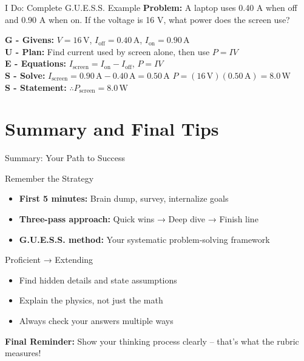 \documentclass{beamer}
\begin{document}
\begin{frame}{I Do: Complete G.U.E.S.S. Example}
\textbf{Problem:} A laptop uses 0.40 A when off and 0.90 A when on. If the voltage is 16 V, what power does the screen use?
\pause 
\vspace{0.5cm}

\textbf{G - Givens:} $V = 16\,\text{V}$, $I_{\text{off}} = 0.40\,\text{A}$, $I_{\text{on}} = 0.90\,\text{A}$ \\
\pause 
\textbf{U - Plan:} Find current used by screen alone, then use $P = IV$ \\
\pause 
\textbf{E - Equations:} $I_{\text{screen}} = I_{\text{on}} - I_{\text{off}}$, $P = IV$ \\
\pause 
\textbf{S - Solve:} 
$I_{\text{screen}} = 0.90\,\text{A} - 0.40\,\text{A} = 0.50\,\text{A}$
$P = (16\,\text{V})(0.50\,\text{A}) = 8.0\,\text{W}$ \\
\pause 
\textbf{S - Statement:} $\boxed{\therefore P_{\text{screen}} = 8.0\,\text{W}}$
\end{frame}


\section{Summary and Final Tips}

\begin{frame}{Summary: Your Path to Success}
\begin{block}{Remember the Strategy}
\begin{itemize}
\item \textbf{First 5 minutes:} Brain dump, survey, internalize goals
\item \textbf{Three-pass approach:} Quick wins → Deep dive → Finish line
\item \textbf{G.U.E.S.S. method:} Your systematic problem-solving framework
\end{itemize}
\end{block}

\begin{block}{Proficient → Extending}
\begin{itemize}
\item Find hidden details and state assumptions
\item Explain the physics, not just the math
\item Always check your answers multiple ways
\end{itemize}
\end{block}

\textbf{Final Reminder:} Show your thinking process clearly – that's what the rubric measures!
\end{frame}
\end{document}
